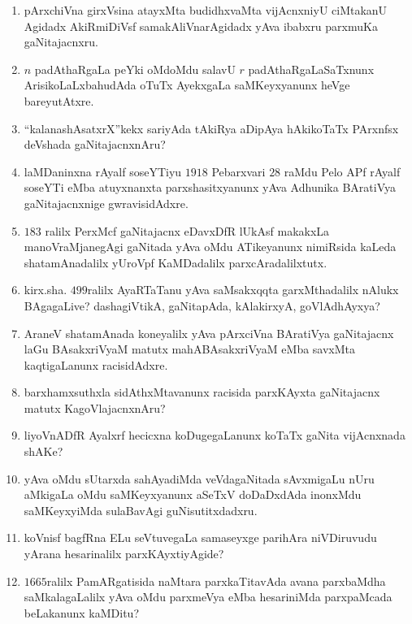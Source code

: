 \begin{enumerate}
\item pArxchiVna girxVsina atayxMta budidhxvaMta vijAcnxniyU ciMtakanU Agidadx AkiRmiDiVsf samakAliVnarAgidadx yAva ibabxru parxmuKa gaNitajacnxru.
  
\item $n$ padAthaRgaLa peYki oMdoMdu salavU $r$ padAthaRgaLaSaTxnunx ArisikoLaLxbahudAda oTuTx AyekxgaLa saMKeyxyanunx heVge bareyutAtxre. 
  
\item ``kalanashAsatxrX''kekx sariyAda tAkiRya aDipAya hAkikoTaTx PArxnfsx deVshada gaNitajacnxnAru?

\item laMDaninxna rAyalf soseYTiyu $1918$ Pebarxvari $28$ raMdu Pelo APf rAyalf soseYTi eMba atuyxnanxta parxshasitxyanunx yAva Adhunika BAratiVya gaNitajacnxnige gwravisidAdxre.

\item $183$ ralilx PerxMcf gaNitajacnx eDavxDfR lUkAsf makakxLa manoVraMjanegAgi gaNitada yAva oMdu ATikeyanunx nimiRsida kaLeda shatamAnadalilx yUroVpf KaMDadalilx parxcAradalilxtutx.
  
\item kirx.sha. $499$ralilx AyaRTaTanu yAva saMsakxqqta garxMthadalilx nAlukx BAgagaLive? dashagiVtikA, gaNitapAda, kAlakirxyA, goVlAdhAyxya?
  
\item AraneV shatamAnada koneyalilx yAva pArxciVna BAratiVya gaNitajacnx laGu BAsakxriVyaM matutx mahABAsakxriVyaM eMba savxMta kaqtigaLanunx racisidAdxre. 
  
\item barxhamxsuthxla sidAthxMtavanunx racisida parxKAyxta gaNitajacnx matutx KagoVlajacnxnAru?
  
\item liyoVnADfR Ayalxrf hecicxna koDugegaLanunx koTaTx gaNita vijAcnxnada shAKe?
  
\item yAva oMdu sUtarxda sahAyadiMda veVdagaNitada sAvxmigaLu nUru aMkigaLa oMdu saMKeyxyanunx aSeTxV doDaDxdAda inonxMdu saMKeyxyiMda sulaBavAgi guNisutitxdadxru.
  
\item koVnisf bagfRna ELu seVtuvegaLa samaseyxge parihAra niVDiruvudu yArana hesarinalilx parxKAyxtiyAgide?

\item $1665$ralilx PamARgatisida naMtara parxkaTitavAda avana parxbaMdha saMkalagaLalilx yAva oMdu parxmeVya eMba hesariniMda parxpaMcada beLakanunx kaMDitu?


\end{enumerate}
